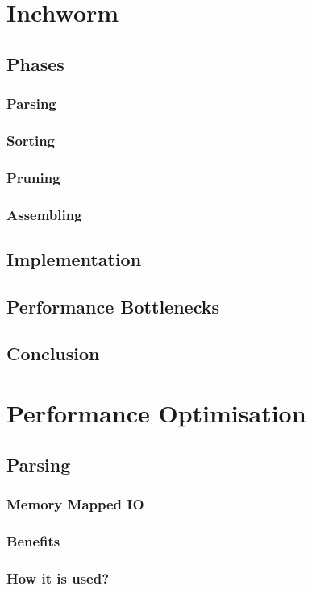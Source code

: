 \documentclass[plainarticle,zihtitle,english,final,hyperref,utf8]{zihpub}
\begin{document}
\section{Inchworm}
\subsection{Phases}
\subsubsection{Parsing}
\subsubsection{Sorting}
\subsubsection{Pruning}
\subsubsection{Assembling}
\subsection{Implementation}
\subsection{Performance Bottlenecks}
\subsection{Conclusion}

\section{Performance Optimisation}
\subsection{Parsing}
\subsubsection{Memory Mapped IO}
\subsubsection{Benefits}
\subsubsection{How it is used?}
\end{document}
